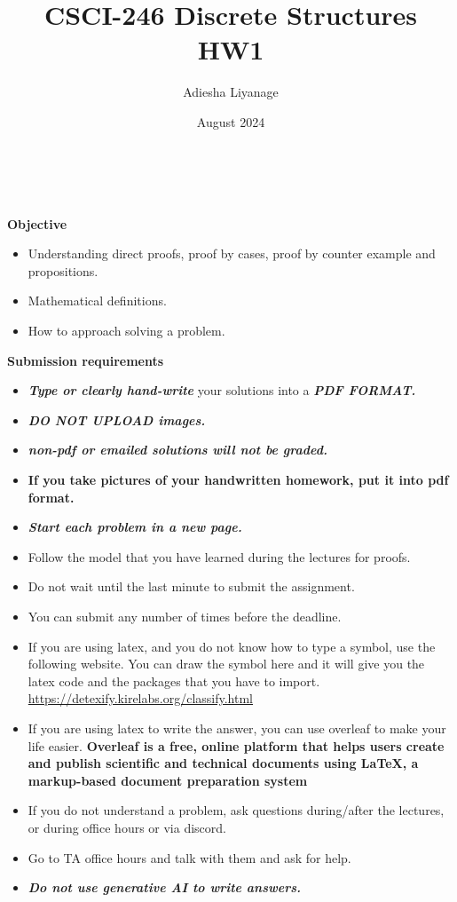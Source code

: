 \documentclass[12pt]{exam}
\title{CSCI-246 Discrete Structures HW1}
\author{Adiesha Liyanage}
\date{August 2024}
\begin{document}
\maketitle

\hrulefill
\\
\\
\textbf{Objective}
\begin{itemize}
    \item Understanding direct proofs, proof by cases, proof by counter example and propositions.
    \item Mathematical definitions.
    \item How to approach solving a problem.
\end{itemize}

\textbf{Submission requirements}
\begin{itemize}
    \item \textbf{\textit{Type or clearly hand-write}} your solutions into a \textbf{\textit{PDF FORMAT.}} 
    \item \textbf{\textit{DO NOT UPLOAD images.}}
    \item \textbf{\textit{non-pdf or emailed solutions will not be graded.}}
    \item \textbf{If you take pictures of your handwritten homework, put it into pdf format.}
    \item \textbf{\textit{Start each problem in a new page.}}
    \item Follow the model that you have learned during the lectures for proofs.
    \item Do not wait until the last minute to submit the assignment.
    \item You can submit any number of times before the deadline. 
    \item If you are using latex, and you do not know how to type a symbol, use the following website. You can draw the symbol here and it will give you the latex code and the packages that you have to import. \url{https://detexify.kirelabs.org/classify.html}
    \item If you are using latex to write the answer, you can use overleaf to make your life easier. \textbf{Overleaf is a free, online platform that helps users create and publish scientific and technical documents using LaTeX, a markup-based document preparation system}
    \item If you do not understand a problem, ask questions during/after the lectures, or during office hours or via discord.
    \item Go to TA office hours and talk with them and ask for help.
    \item \textbf{\textit{Do not use generative AI to write answers.}} 
\end{itemize}
\end{document}
